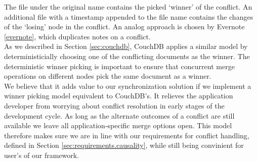 The file under the original name contains the picked `winner' of the conflict.
An additional file with a timestamp appended to the file name contains the changes of the `losing' node in the conflict.
An analog approach is chosen by Evernote \ref{evernote}, which duplicates notes on a conflict.\\
As we described in Section \ref{sec:couchdb}, CouchDB applies a similar model by deterministicially choosing one of the conflicting documents as the winner.
The deterministic winner picking is important to ensure that concurrent merge operations on different nodes pick the same document as a winner.\\
We believe that it adds value to our synchronization solution if we implement a winner picking model equivalent to CouchDB's.
It relieves the application developer from worrying about conflict resolution in early stages of the development cycle.
As long as the alternate outcomes of a conflict are still available we leave all application-specific merge options open.
This model therefore makes sure we are in line with our requirements for conflict handling, defined in Section \ref{sec:requirements.causality}, while still being convinient for user's of our framework.

